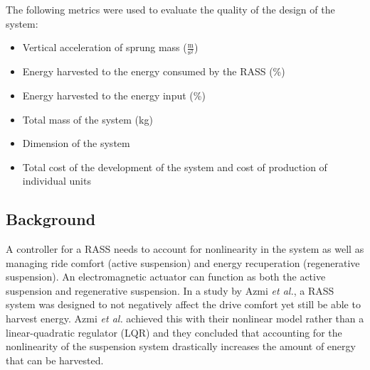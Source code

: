 The following metrics were used to evaluate the quality of the design of the system:
\begin{itemize}
    \item Vertical acceleration of sprung mass ($\frac{\text{m}}{\text{s}^2}$)
    \item Energy harvested to the energy consumed by the RASS (\%)
    \item Energy harvested to the energy input (\%)
    \item Total mass of the system (kg)
    \item Dimension of the system
    \item Total cost of the development of the system and cost of production of individual units
\end{itemize}




\subsection{Background}




A controller for a RASS needs to account for nonlinearity in the system as well as managing ride comfort (active suspension) and energy recuperation (regenerative suspension)\:\cite{azmiNovelOptimalControl2023}. An electromagnetic actuator can function as both the active suspension and regenerative suspension\:\cite{azmiNovelOptimalControl2023}. In a study by Azmi \textit{et al.}, a RASS system was designed to not negatively affect the drive comfort yet still be able to harvest energy\:\cite{azmiNovelOptimalControl2023}. Azmi \textit{et al.} achieved this with their nonlinear model rather than a linear-quadratic regulator (LQR) and they concluded that accounting for the nonlinearity of the suspension system drastically increases the amount of energy that can be harvested\:\cite{azmiNovelOptimalControl2023}.

